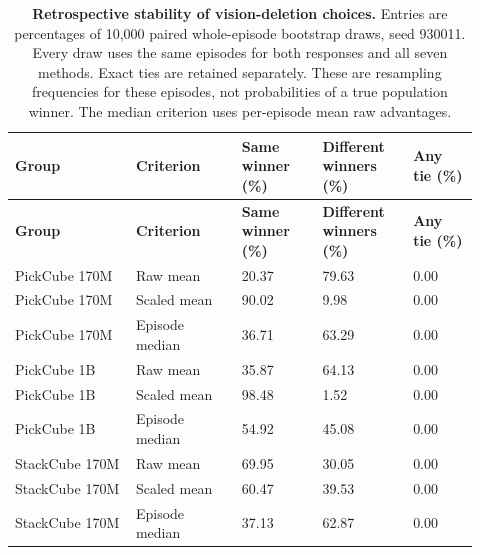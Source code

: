 \setlength{\tabcolsep}{2pt}
\begin{longtable}{p{0.240\linewidth} p{0.210\linewidth} p{0.160\linewidth} p{0.180\linewidth} p{0.130\linewidth}}
\caption{\textbf{Retrospective stability of vision-deletion choices.} Entries are percentages of 10,000 paired whole-episode bootstrap draws, seed 930011. Every draw uses the same episodes for both responses and all seven methods. Exact ties are retained separately. These are resampling frequencies for these episodes, not probabilities of a true population winner. The median criterion uses per-episode mean raw advantages.}\label{tab:r1-stability}\\
\toprule
\textbf{Group} & \textbf{Criterion} & \textbf{Same winner (\%)} & \textbf{Different winners (\%)} & \textbf{Any tie (\%)} \\
\midrule\endfirsthead
\toprule
\textbf{Group} & \textbf{Criterion} & \textbf{Same winner (\%)} & \textbf{Different winners (\%)} & \textbf{Any tie (\%)} \\
\midrule\endhead
\bottomrule\endfoot
PickCube 170M & Raw mean & 20.37 & 79.63 & 0.00 \\
PickCube 170M & Scaled mean & 90.02 & 9.98 & 0.00 \\
PickCube 170M & Episode median & 36.71 & 63.29 & 0.00 \\
PickCube 1B & Raw mean & 35.87 & 64.13 & 0.00 \\
PickCube 1B & Scaled mean & 98.48 & 1.52 & 0.00 \\
PickCube 1B & Episode median & 54.92 & 45.08 & 0.00 \\
StackCube 170M & Raw mean & 69.95 & 30.05 & 0.00 \\
StackCube 170M & Scaled mean & 60.47 & 39.53 & 0.00 \\
StackCube 170M & Episode median & 37.13 & 62.87 & 0.00 \\
\end{longtable}

